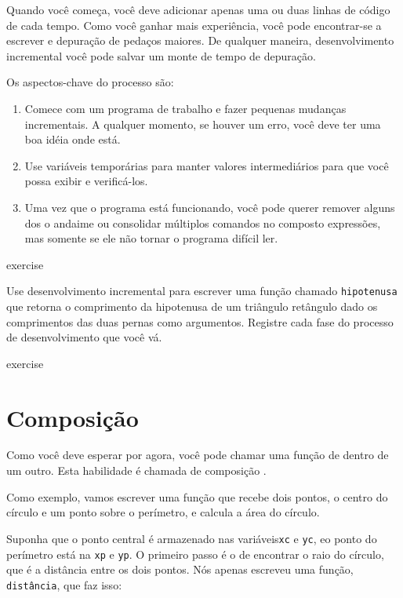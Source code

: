\documentclass[10pt]{book}
\begin{document}
\begin{exercise}
{{{Quando você começa, você deve adicionar apenas uma ou duas linhas de código de cada
tempo. Como você ganhar mais experiência, você pode encontrar-se a escrever
e depuração de pedaços maiores. De qualquer maneira, desenvolvimento incremental
você pode salvar um monte de tempo de depuração.

Os aspectos-chave do processo são:

\begin{enumerate}

\item Comece com um programa de trabalho e fazer pequenas mudanças incrementais. 
A qualquer momento, se houver um erro, você deve ter uma boa idéia
onde está.

\item Use variáveis ​​temporárias para manter valores intermediários para que você possa
exibir e verificá-los.

\item Uma vez que o programa está funcionando, você pode querer remover alguns dos
o andaime ou consolidar múltiplos comandos no composto
expressões, mas somente se ele não tornar o programa difícil
ler.

\end{enumerate}

\begin{} exercise

Use desenvolvimento incremental para escrever uma função
chamado {\tt hipotenusa} que retorna o comprimento da hipotenusa de um
triângulo retângulo dado os comprimentos das duas pernas como argumentos.
Registre cada fase do processo de desenvolvimento que você vá.
\end{} exercise


\section{Composição}

Como você deve esperar por agora, você pode chamar uma função de
dentro de um outro. Esta habilidade é chamada de composição {\bf}.

Como exemplo, vamos escrever uma função que recebe dois pontos,
o centro do círculo e um ponto sobre o perímetro, e calcula
a área do círculo.

Suponha que o ponto central é armazenado nas variáveis ​​{\tt xc} e
{\tt yc}, eo ponto do perímetro está na {\tt xp} e {\tt yp}. O
primeiro passo é o de encontrar o raio do círculo, que é a distância
entre os dois pontos. Nós apenas escreveu uma função, {\tt
distância}, que faz isso:

}}}
\end{exercise}
\end{document}
